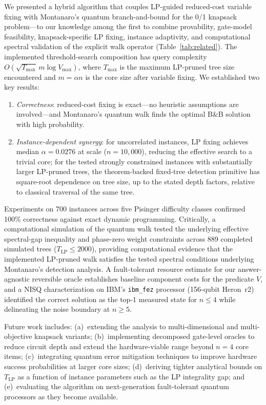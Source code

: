 \documentclass[conference]{IEEEtran} \IEEEoverridecommandlockouts
\begin{document}
We presented a hybrid algorithm that couples LP-guided reduced-cost variable fixing with Montanaro's quantum branch-and-bound for the 0/1 knapsack problem---to our knowledge among the first to combine provability, gate-model feasibility, knapsack-specific LP fixing, instance adaptivity, and computational spectral validation of the explicit walk operator (Table~\ref{tab:related}). The implemented threshold-search composition has query complexity $O\!\left(\sqrt{T_{\max}}\,m\log V_{\max}\right)$, where $T_{\max}$ is the maximum LP-pruned tree size encountered and $m = \alpha n$ is the core size after variable fixing. We established two key results:

\begin{enumerate}     \item \textit{Correctness}: reduced-cost fixing is exact---no heuristic assumptions are involved---and Montanaro's quantum walk finds the optimal B\&B solution with high probability.     \item \textit{Instance-dependent synergy}: for uncorrelated instances, LP fixing achieves median $\alpha = 0.0276$ at scale ($n = 10{,}000$), reducing the effective search to a trivial core; for the tested strongly constrained instances with substantially larger LP-pruned trees, the theorem-backed fixed-tree detection primitive has square-root dependence on tree size, up to the stated depth factors, relative to classical traversal of the same tree.     \end{enumerate}

Experiments on 700 instances across five Pisinger difficulty classes confirmed 100\% correctness against exact dynamic programming. Critically, a computational simulation of the quantum walk tested the underlying effective spectral-gap inequality and phase-zero weight constraints across 889 completed simulated trees ($T_{\text{LP}} \le 2000$), providing computational evidence that the implemented LP-pruned walk satisfies the tested spectral conditions underlying Montanaro's detection analysis. A fault-tolerant resource estimate for our answer-agnostic reversible oracle establishes baseline component costs for the predicate $V$, and a NISQ characterization on IBM's \texttt{ibm\_fez} processor (156-qubit Heron~r2) identified the correct solution as the top-1 measured state for $n \leq 4$ while delineating the noise boundary at $n \geq 5$.

Future work includes: (a)~extending the analysis to multi-dimensional and multi-objective knapsack variants; (b)~implementing decomposed gate-level oracles to reduce circuit depth and extend the hardware-viable range beyond $n = 4$ core items; (c)~integrating quantum error mitigation techniques to improve hardware success probabilities at larger core sizes; (d)~deriving tighter analytical bounds on $T_{\text{LP}}$ as a function of instance parameters such as the LP integrality gap; and (e)~evaluating the algorithm on next-generation fault-tolerant quantum processors as they become available.
\end{document}
